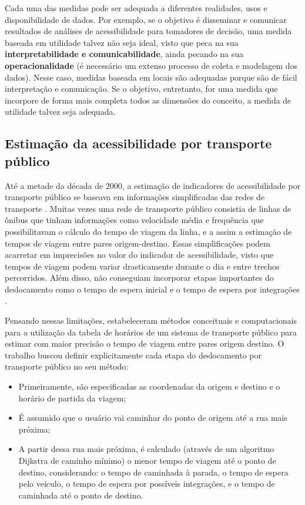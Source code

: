 \documentclass[        
    a4paper,          %
    12pt,             %
    chapter=TITLE,    %
    section=Title,    %
    subsection=Title, %
    oneside,          %
    english,          %
    spanish,          %
    brazil,           %
    fleqn             %
]{abntex2}
\begin{document}
  Cada uma das medidas pode ser adequada a diferentes realidades, usos e disponibilidade de dados. Por exemplo, se o objetivo é disseminar e comunicar resultados de análises de acessibilidade para tomadores de decisão, uma medida baseada em utilidade talvez não seja ideal, visto que peca na sua \textbf{interpretabilidade e comunicabilidade}, ainda pecando na sua \textbf{operacionalidade} (é necessário um extenso processo de coleta e modelagem dos dados). Nesse caso, medidas baseada em locais são adequadas porque são de fácil interpretação e comunicação. Se o objetivo, entretanto, for uma medida que incorpore de forma mais completa todos as dimensões do conceito, a medida de utilidade talvez seja adequada.
  
  \hypertarget{estimacao-da-acessibilidade-por-transporte-publico}{%
  \subsection{Estimação da acessibilidade por transporte público}\label{estimacao-da-acessibilidade-por-transporte-publico}}
  
  Até a metade da década de 2000, a estimação de indicadores de acessibilidade por transporte público se baseava em informações simplificadas das redes de transporte \citep{Owen2015}. Muitas vezes uma rede de transporte público consistia de linhas de ônibus que tinham informações como velocidade média e frequência que possibilitavam o cálculo do tempo de viagem da linha, e a assim a estimação de tempos de viagem entre pares origem-destino. Essas simplificações podem acarretar em imprecisões no valor do indicador de acessibilidade, visto que tempos de viagem podem variar drasticamente durante o dia e entre trechos percorridos. Além disso, não conseguiam incorporar etapas importantes do deslocamento como o tempo de espera inicial e o tempo de espera por integrações \citep{Lei2010}.
  
  Pensando nessas limitações, \citet{Lei2010} estabeleceram métodos conceituais e computacionais para a utilização da tabela de horários de um sistema de transporte público para estimar com maior precisão o tempo de viagem entre pares origem destino. O trabalho buscou definir explicitamente cada etapa do deslocamento por transporte público no seu método:
  
  \begin{itemize}
  \tightlist
  \item
    Primeiramente, são especificadas as coordenadas da origem e destino e o horário de partida da viagem;
  \item
    É assumido que o usuário vai caminhar do ponto de origem até a rua mais próxima;
  \item
    A partir dessa rua mais próxima, é calculado (através de um algoritmo Dijkstra de caminho mínimo) o menor tempo de viagem até o ponto de destino, considerando: o tempo de caminhada à parada, o tempo de espera pelo veículo, o tempo de espera por possíveis integrações, e o tempo de caminhada até o ponto de destino.
  \end{itemize}
  
\end{document}
